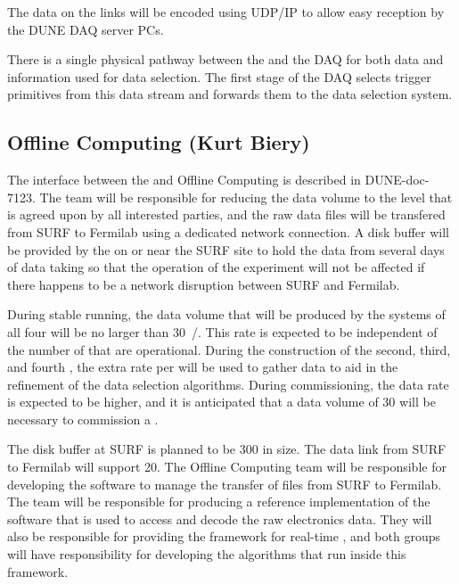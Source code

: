 The data on the links will be encoded using UDP/IP to allow easy
reception by the DUNE DAQ server PCs.

There is a single physical pathway between the  and the DAQ for
both data and information used for data selection. The first stage of
the DAQ selects trigger primitives from this data stream and forwards
them to the data selection system.

\subsection{Offline Computing (Kurt Biery)}
\label{sec:fdsp-daq-intfc-fnal-cmptg}

The interface between the  and Offline Computing is described in
DUNE-doc-7123. The  team will be responsible for reducing the
data volume to the level that is agreed upon by all interested parties,
and the raw data files will be transfered from SURF to Fermilab using
a dedicated network connection. A disk buffer will be provided by the
 on or near the SURF site to hold the data from several days
of data taking so that the operation of the experiment will not be affected
if there happens to be a network disruption between SURF and Fermilab.

During stable running, the data volume that will be produced by the
 systems of all four  will be no larger
than \SI{30}{\PB/\year}. This rate is expected to be independent of the number
of  that are operational. During the construction
of the second, third, and fourth , the extra rate
per  will be used to gather data to aid in the
refinement of the data selection algorithms.
During commissioning, the data rate is expected to  be higher,
and it is anticipated that a data volume
of \SI{30}{\PB} will be necessary to commission a .

The disk buffer at SURF is planned to be \SI{300}{\TB} in size.  The data
link from SURF to Fermilab will support \SI{20}{\Gbps}.  The Offline Computing
team will be responsible for developing the software to manage the
transfer of files from SURF to Fermilab. The  team will be
responsible for producing a
reference implementation of the software that is used to access and
decode the raw electronics data. They will also be responsible for
providing the framework for real-time , and
both groups will have responsibility for developing the 
algorithms that run inside this framework.

